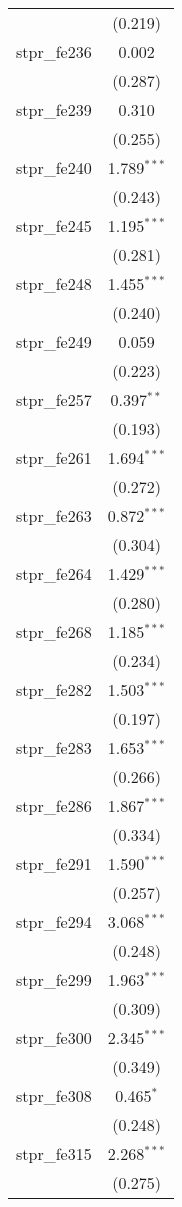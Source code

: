 \begin{table}[!htbp]
\begin{tabular}{@{\extracolsep{5pt}}lc}
  & (0.219) \\ 
  stpr\_fe236 & 0.002 \\ 
  & (0.287) \\ 
  stpr\_fe239 & 0.310 \\ 
  & (0.255) \\ 
  stpr\_fe240 & 1.789$^{***}$ \\ 
  & (0.243) \\ 
  stpr\_fe245 & 1.195$^{***}$ \\ 
  & (0.281) \\ 
  stpr\_fe248 & 1.455$^{***}$ \\ 
  & (0.240) \\ 
  stpr\_fe249 & 0.059 \\ 
  & (0.223) \\ 
  stpr\_fe257 & 0.397$^{**}$ \\ 
  & (0.193) \\ 
  stpr\_fe261 & 1.694$^{***}$ \\ 
  & (0.272) \\ 
  stpr\_fe263 & 0.872$^{***}$ \\ 
  & (0.304) \\ 
  stpr\_fe264 & 1.429$^{***}$ \\ 
  & (0.280) \\ 
  stpr\_fe268 & 1.185$^{***}$ \\ 
  & (0.234) \\ 
  stpr\_fe282 & 1.503$^{***}$ \\ 
  & (0.197) \\ 
  stpr\_fe283 & 1.653$^{***}$ \\ 
  & (0.266) \\ 
  stpr\_fe286 & 1.867$^{***}$ \\ 
  & (0.334) \\ 
  stpr\_fe291 & 1.590$^{***}$ \\ 
  & (0.257) \\ 
  stpr\_fe294 & 3.068$^{***}$ \\ 
  & (0.248) \\ 
  stpr\_fe299 & 1.963$^{***}$ \\ 
  & (0.309) \\ 
  stpr\_fe300 & 2.345$^{***}$ \\ 
  & (0.349) \\ 
  stpr\_fe308 & 0.465$^{*}$ \\ 
  & (0.248) \\ 
  stpr\_fe315 & 2.268$^{***}$ \\ 
  & (0.275) \\ 

\end{tabular}
\end{table}
